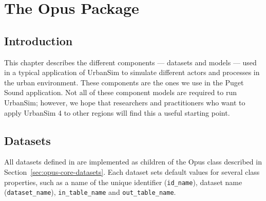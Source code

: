 
\chapter{The  Opus Package}

\section{Introduction}

This chapter describes the different components --- datasets \datasetindex and models \modelsindex ---
used in a typical application of UrbanSim to simulate different actors and
processes in the urban environment.  These components are the ones we
use in the Puget Sound application.  Not all of these component models are required
to run UrbanSim; however, we hope that researchers and practitioners who want
to apply UrbanSim 4 to other regions will find this a useful starting point.


\section{Datasets}
\label{sec:urbansim-datasets}
\datasetindex
%
All datasets \datasetindex defined in  are implemented as children of the
Opus  class  \datasetindex described in
Section~\ref{sec:opus-core-datasets}. Each dataset \datasetindex sets default values for several
class properties, such as a name of the unique identifier (\verb|id_name|),
dataset \datasetindex name (\verb|dataset_name|), \datasetindex \verb|in_table_name| and
\verb|out_table_name|. 

